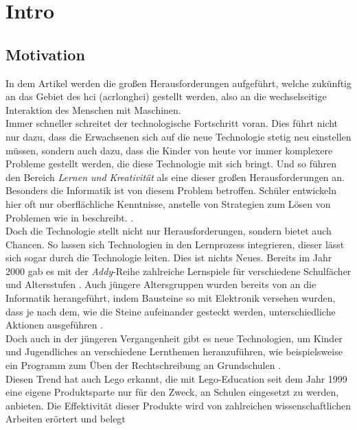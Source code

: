 \chapter{Intro}


\section{Motivation}

In dem Artikel  werden die großen Herausforderungen aufgeführt, welche zukünftig an das Gebiet des \acrshort{hci} (acrlong{hci}) gestellt werden, also an die wechselseitige Interaktion des Menschen mit Maschinen.\\  Immer schneller schreitet der technologische Fortschritt voran. Dies führt nicht nur dazu, dass die Erwachsenen sich auf die neue Technologie stetig neu einstellen müssen, sondern auch dazu, dass die Kinder von heute vor immer komplexere Probleme gestellt werden, die diese Technologie mit sich bringt. Und so führen \citeauthor{stephanidis_seven_2019} den Bereich \textit{Lernen und Kreativität} als eine dieser großen Herausforderungen an. Besonders die Informatik ist von diesem Problem betroffen. Schüler entwickeln hier oft nur oberflächliche Kenntnisse, anstelle von Strategien zum Lösen von Problemen wie \citeauthor{kazimoglu_serious_2012} in  beschreibt. \cite{kazimoglu_serious_2012}.\\
Doch die Technologie stellt nicht nur Herausforderungen, sondern bietet auch Chancen. So lassen sich Technologien in den Lernprozess integrieren, dieser lässt sich sogar durch die Technologie leiten. Dies ist nichts Neues. Bereits im Jahr 2000 gab es mit der \textit{Addy}-Reihe zahlreiche Lernspiele für verschiedene Schulfächer und Altersstufen \cite{addy}. Auch jüngere Altersgruppen wurden bereits \citeyear{wyeth_tangible_2002} von \citeauthor{wyeth_tangible_2002} an die Informatik herangeführt, indem Bausteine so mit Elektronik versehen wurden, dass je nach dem, wie die Steine aufeinander gesteckt werden, unterschiedliche Aktionen ausgeführen \cite{wyeth_tangible_2002}. \\
Doch auch in der jüngeren Vergangenheit gibt es neue Technologien, um Kinder und Jugendliches an verschiedene Lernthemen heranzuführen, wie beispielsweise ein Programm zum Üben der Rechtschreibung an Grundschulen \cite{berkling_learning_2020}.\\
Diesen Trend hat auch \gls{Lego} erkannt, die mit \gls{Lego}-Education seit dem Jahr 1999 eine eigene Produktsparte nur für den Zweck, an Schulen eingesetzt zu werden, anbieten. Die Effektivität dieser Produkte wird von zahlreichen wissenschaftlichen Arbeiten erörtert und belegt \cite{perez_new_2015, karatrantou_algorithm_2008, jun_design_2016, cuellar_design_2014, klassner_lego_2003}\\
